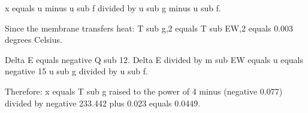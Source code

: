 x equals u minus u sub f divided by u sub g minus u sub f.  

Since the membrane transfers heat:  
T sub g,2 equals T sub EW,2 equals 0.003 degrees Celsius.  

Delta E equals negative Q sub 12.  
Delta E divided by m sub EW equals u equals negative 15 u sub g divided by u sub f.  

Therefore:  
x equals T sub g raised to the power of 4 minus (negative 0.077) divided by negative 233.442 plus 0.023 equals 0.0449.